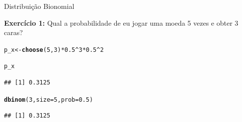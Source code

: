 \documentclass{beamer}\usepackage[]{graphicx}\usepackage[]{color}
\makeatletter
\newcommand{\hlnum}[1]{\textcolor[rgb]{0.686,0.059,0.569}{#1}}%
\newcommand{\hlopt}[1]{\textcolor[rgb]{0,0,0}{#1}}%
\newcommand{\hlstd}[1]{\textcolor[rgb]{0.345,0.345,0.345}{#1}}%
\newcommand{\hlkwb}[1]{\textcolor[rgb]{0.69,0.353,0.396}{#1}}%
\newcommand{\hlkwc}[1]{\textcolor[rgb]{0.333,0.667,0.333}{#1}}%
\newcommand{\hlkwd}[1]{\textcolor[rgb]{0.737,0.353,0.396}{\textbf{#1}}}%
\newenvironment{kframe}{%
 \def\at@end@of@kframe{}%
 \ifinner\ifhmode%
  \def\at@end@of@kframe{\end{minipage}}%
  \begin{minipage}{\columnwidth}%
 \fi\fi%
 \def\FrameCommand##1{\hskip\@totalleftmargin \hskip-\fboxsep
 \colorbox{shadecolor}{##1}\hskip-\fboxsep
     \hskip-\linewidth \hskip-\@totalleftmargin \hskip\columnwidth}%
 \MakeFramed {\advance\hsize-\width
   \@totalleftmargin\z@ \linewidth\hsize
   \@setminipage}}%
 {\par\unskip\endMakeFramed%
 \at@end@of@kframe}
\newenvironment{knitrout}{}{} %
\renewenvironment{knitrout}{\setlength{\topsep}{0mm}}{}
\makeatother
\begin{document}
\begin{frame}[fragile]{Distribuição Bionomial}

\alert{\textbf{Exercício 1:}} Qual a probabilidade de eu jogar uma moeda 5 vezes e obter 3 caras?
\vfill

\begin{knitrout}\tiny
{}\color{fgcolor}\begin{kframe}
\begin{alltt}
\hlstd{p_x} \hlkwb{<-} \hlkwd{choose}\hlstd{(}\hlnum{5}\hlstd{,}\hlnum{3}\hlstd{)} \hlopt{*} \hlnum{0.5}\hlopt{^}\hlnum{3} \hlopt{*} \hlnum{0.5}\hlopt{^}\hlnum{2}

\hlstd{p_x}
\end{alltt}
\begin{verbatim}
## [1] 0.3125
\end{verbatim}
\begin{alltt}
\hlkwd{dbinom}\hlstd{(}\hlnum{3}\hlstd{,}\hlkwc{size}\hlstd{=}\hlnum{5}\hlstd{,}\hlkwc{prob}\hlstd{=}\hlnum{0.5}\hlstd{)}
\end{alltt}
\begin{verbatim}
## [1] 0.3125
\end{verbatim}
\end{kframe}
\end{knitrout}


\end{frame} 
\end{document}

